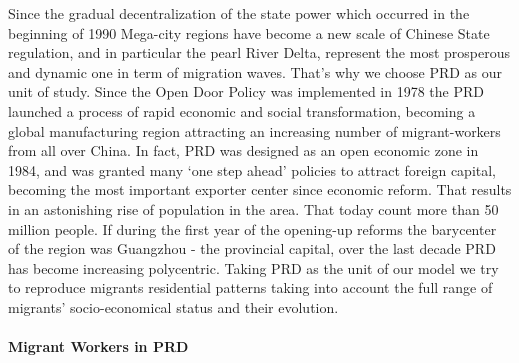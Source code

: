 Since the gradual decentralization of the state power which occurred in the beginning of  1990 Mega-city regions have become a new scale of Chinese State regulation, and in particular the pearl River Delta, represent the most prosperous and dynamic one in term of migration waves. 
That’s why we choose PRD as our unit of study. Since the Open Door Policy was implemented in 1978 the PRD launched a process of rapid economic and social transformation, becoming a global manufacturing region attracting an increasing number of migrant-workers from all over China. In fact, PRD was designed as an open economic zone in 1984, and was granted many ‘one step ahead’ policies to attract foreign capital, becoming the most important exporter center since economic reform. That results in an astonishing rise of population in the area. That today count more than 50 million people. If during the first year of the opening-up reforms the barycenter of the region was Guangzhou - the provincial capital, over the last decade PRD has become increasing polycentric.
Taking PRD as the unit of our model we try to reproduce migrants residential patterns taking into account the full range of migrants’ socio-economical status and their evolution. 



\paragraph{Migrant Workers in PRD}


